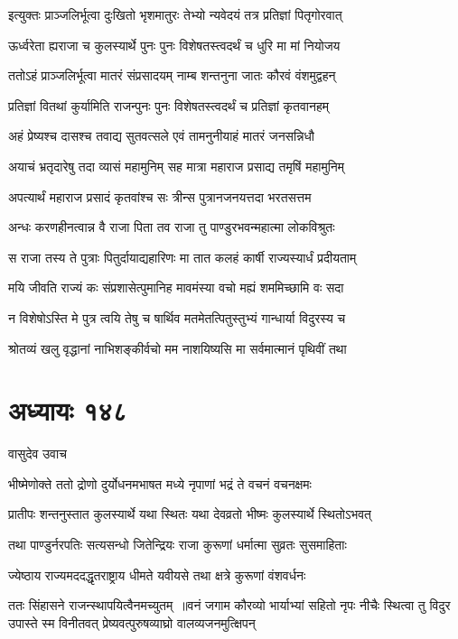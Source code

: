 \twolineshloka
{इत्युक्तः प्राञ्जलिर्भूत्वा दुःखितो भृशमातुरः}
{तेभ्यो न्यवेदयं तत्र प्रतिज्ञां पितृगोरवात्}


\twolineshloka
{ऊर्ध्वरेता ह्यराजा च कुलस्यार्थे पुनः पुनः}
{विशेषतस्त्वदर्थं च धुरि मा मां नियोजय}


\twolineshloka
{ततोऽहं प्राञ्जलिर्भूत्वा मातरं संप्रसादयम्}
{नाम्ब शन्तनुना जातः कौरवं वंशमुद्वहन्}


\twolineshloka
{प्रतिज्ञां वितथां कुर्यामिति राजन्पुनः पुनः}
{विशेषतस्त्वदर्थं च प्रतिज्ञां कृतवानहम्}


\twolineshloka
{अहं प्रेष्यश्च दासश्च तवाद्य सुतवत्सले}
{एवं तामनुनीयाहं मातरं जनसन्निधौ}


\threelineshloka
{अयाचं भ्रतृदारेषु तदा व्यासं महामुनिम्}
{सह मात्रा महाराज प्रसाद्य तमृषिं महामुनिम्}
{}


\twolineshloka
{अपत्यार्थं महाराज प्रसादं कृतवांश्च सः}
{त्रीन्स पुत्रानजनयत्तदा भरतसत्तम}


\twolineshloka
{अन्धः करणहीनत्वान्न वै राजा पिता तव}
{राजा तु पाण्डुरभवन्महात्मा लोकविश्रुतः}


\twolineshloka
{स राजा तस्य ते पुत्राः पितुर्दायाद्यहारिणः}
{मा तात कलहं कार्षी राज्यस्यार्धं प्रदीयताम्}


\twolineshloka
{मयि जीवति राज्यं कः संप्रशासेत्पुमानिह}
{मावमंस्या वचो मह्यं शममिच्छामि वः सदा}


\twolineshloka
{न विशेषोऽस्ति मे पुत्र त्वयि तेषु च षार्थिव}
{मतमेतत्पितुस्तुभ्यं गान्धार्या विदुरस्य च}


\twolineshloka
{श्रोतव्यं खलु वृद्धानां नाभिशङ्कीर्वचो मम}
{नाशयिष्यसि मा सर्वमात्मानं पृथिवीं तथा}


\chapter{अध्यायः १४८}
\twolineshloka
{वासुदेव उवाच}
{}


\twolineshloka
{भीष्मेणोक्ते ततो द्रोणो दुर्योधनमभाषत}
{मध्ये नृपाणां भद्रं ते वचनं वचनक्षमः}


\twolineshloka
{प्रातीपः शन्तनुस्तात कुलस्यार्थे यथा स्थितः}
{यथा देवव्रतो भीष्मः कुलस्यार्थे स्थितोऽभवत्}


\twolineshloka
{तथा पाण्डुर्नरपतिः सत्यसन्धो जितेन्द्रियः}
{राजा कुरूणां धर्मात्मा सुव्रतः सुसमाहिताः}


\threelineshloka
{ज्येष्ठाय राज्यमददद्धृतराष्ट्राय धीमते}
{यवीयसे तथा क्षत्रे कुरूणां वंशवर्धनः}
{}


ततः सिंहासने राजन्स्थापयित्वैनमच्युतम् ॥वनं जगाम कौरव्यो भार्याभ्यां सहितो नृपः
\twolineshloka
{नीचैः स्थित्वा तु विदुर उपास्ते स्म विनीतवत्}
{प्रेष्यवत्पुरुषव्याघ्रो वालव्यजनमुत्क्षिपन्}


